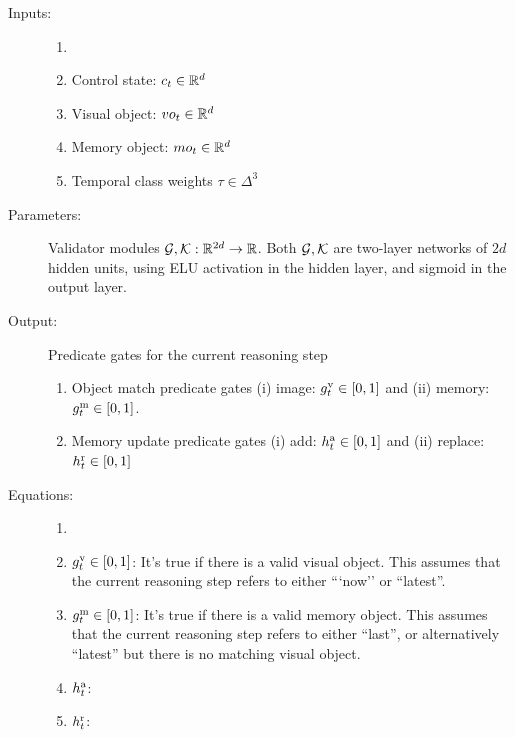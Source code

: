 

\begin{description}
	\item[Inputs:] 
	\begin{enumerate}
		\item[]
		\item Control state: $c_t \in \mathbb{R}^d$
		\item Visual object: $vo_t \in \mathbb{R}^d$
		\item Memory object: $mo_t \in \mathbb{R}^d$
		\item Temporal class weights $\tau \in \Delta^3$
	\end{enumerate}
	
	\item[Parameters:] Validator modules $\mathcal{G}, \mathcal{K}: \mathbb{R}^{2d} \to \mathbb{R}$.
	Both $\mathcal{G}, \mathcal{K}$ are two-layer networks of $2d$ hidden units,
	using ELU activation in the hidden layer, and sigmoid in the output layer.
	
	\item[Output:] Predicate gates for the current reasoning step
	\begin{enumerate}
		\item Object match predicate gates (i) image: $g^{\mathrm{v}}_t \in [0,1]$ and 
		(ii) memory: $g^{\mathrm{m}}_t \in [0,1]$.
		
		\item Memory update predicate gates (i) add: $h^{\mathrm{a}}_t \in [0,1]$ and
		(ii) replace: $h^{\mathrm{r}}_t \in [0,1]$
	\end{enumerate}
	
	\item[Equations:]
	\begin{enumerate}
		\item[]
		\item $g^{\mathrm{v}}_t \in [0,1]$:
		It's true if there is a valid visual object. This assumes that
		the current reasoning step refers to either ```now''  or ``latest''.
		
		\item$g^{\mathrm{m}}_t \in [0,1]$:
		It's true if there is a valid memory object. This assumes that
		the current reasoning step refers to either ``last'',  or alternatively ``latest'' 
		but there is no matching visual object.
		
		\item $h^{\mathrm{a}}_t$:
		
		
		\item $h^{\mathrm{r}}_t$: 
	\end{enumerate}
\end{description}



